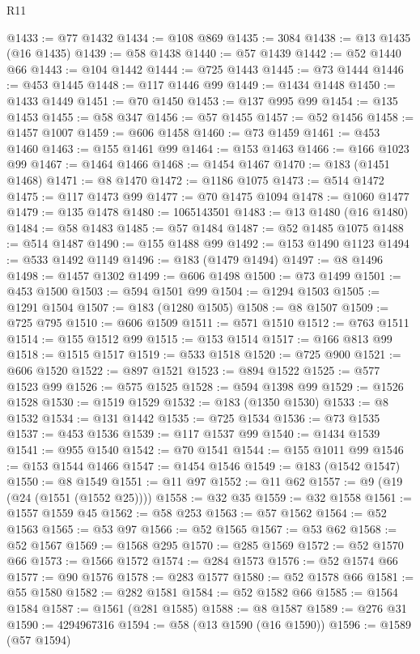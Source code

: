 \begin{lexlean}{R11}
\begin{coremodule}
@1433 := @77 @1432
@1434 := @108 @869
@1435 := 3084
@1438 := @13 @1435 (@16 @1435)
@1439 := @58 @1438
@1440 := @57 @1439
@1442 := @52 @1440 @66
@1443 := @104 @1442
@1444 := @725 @1443
@1445 := @73 @1444
@1446 := @453 @1445
@1448 := @117 @1446 @99
@1449 := @1434 @1448
@1450 := @1433 @1449
@1451 := @70 @1450
@1453 := @137 @995 @99
@1454 := @135 @1453
@1455 := @58 @347
@1456 := @57 @1455
@1457 := @52 @1456
@1458 := @1457 @1007
@1459 := @606 @1458
@1460 := @73 @1459
@1461 := @453 @1460
@1463 := @155 @1461 @99
@1464 := @153 @1463
@1466 := @166 @1023 @99
@1467 := @1464 @1466
@1468 := @1454 @1467
@1470 := @183 (@1451 @1468)
@1471 := @8 @1470
@1472 := @1186 @1075
@1473 := @514 @1472
@1475 := @117 @1473 @99
@1477 := @70 @1475 @1094
@1478 := @1060 @1477
@1479 := @135 @1478
@1480 := 1065143501
@1483 := @13 @1480 (@16 @1480)
@1484 := @58 @1483
@1485 := @57 @1484
@1487 := @52 @1485 @1075
@1488 := @514 @1487
@1490 := @155 @1488 @99
@1492 := @153 @1490 @1123
@1494 := @533 @1492 @1149
@1496 := @183 (@1479 @1494)
@1497 := @8 @1496
@1498 := @1457 @1302
@1499 := @606 @1498
@1500 := @73 @1499
@1501 := @453 @1500
@1503 := @594 @1501 @99
@1504 := @1294 @1503
@1505 := @1291 @1504
@1507 := @183 (@1280 @1505)
@1508 := @8 @1507
@1509 := @725 @795
@1510 := @606 @1509
@1511 := @571 @1510
@1512 := @763 @1511
@1514 := @155 @1512 @99
@1515 := @153 @1514
@1517 := @166 @813 @99
@1518 := @1515 @1517
@1519 := @533 @1518
@1520 := @725 @900
@1521 := @606 @1520
@1522 := @897 @1521
@1523 := @894 @1522
@1525 := @577 @1523 @99
@1526 := @575 @1525
@1528 := @594 @1398 @99
@1529 := @1526 @1528
@1530 := @1519 @1529
@1532 := @183 (@1350 @1530)
@1533 := @8 @1532
@1534 := @131 @1442
@1535 := @725 @1534
@1536 := @73 @1535
@1537 := @453 @1536
@1539 := @117 @1537 @99
@1540 := @1434 @1539
@1541 := @955 @1540
@1542 := @70 @1541
@1544 := @155 @1011 @99
@1546 := @153 @1544 @1466
@1547 := @1454 @1546
@1549 := @183 (@1542 @1547)
@1550 := @8 @1549
@1551 := @11 @97
@1552 := @11 @62
@1557 := @9 (@19 (@24 (@1551 (@1552 @25))))
@1558 := @32 @35
@1559 := @32 @1558
@1561 := @1557 @1559 @45
@1562 := @58 @253
@1563 := @57 @1562
@1564 := @52 @1563
@1565 := @53 @97
@1566 := @52 @1565
@1567 := @53 @62
@1568 := @52 @1567
@1569 := @1568 @295
@1570 := @285 @1569
@1572 := @52 @1570 @66
@1573 := @1566 @1572
@1574 := @284 @1573
@1576 := @52 @1574 @66
@1577 := @90 @1576
@1578 := @283 @1577
@1580 := @52 @1578 @66
@1581 := @55 @1580
@1582 := @282 @1581
@1584 := @52 @1582 @66
@1585 := @1564 @1584
@1587 := @1561 (@281 @1585)
@1588 := @8 @1587
@1589 := @276 @31
@1590 := 4294967316
@1594 := @58 (@13 @1590 (@16 @1590))
@1596 := @1589 (@57 @1594)

\end{coremodule}
\end{lexlean}
